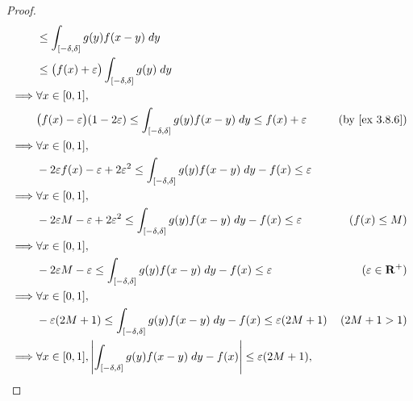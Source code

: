 \begin{proof}
\begin{align*}
             & \leq \int_{[-\delta, \delta]} g(y) f(x - y) \; dy                                                                                                           \\
             & \leq \big(f(x) + \varepsilon\big) \int_{[-\delta, \delta]} g(y) \; dy                                                                                       \\
    \implies & \forall x \in [0, 1],                                                                                                                                       \\
             & \big(f(x) - \varepsilon\big) (1 - 2 \varepsilon) \leq \int_{[-\delta, \delta]} g(y) f(x - y) \; dy \leq f(x) + \varepsilon    & \text{(by \cref{ex 3.8.6})} \\
    \implies & \forall x \in [0, 1],                                                                                                                                       \\
             & -2 \varepsilon f(x) - \varepsilon + 2 \varepsilon^2 \leq \int_{[-\delta, \delta]} g(y) f(x - y) \; dy - f(x) \leq \varepsilon                               \\
    \implies & \forall x \in [0, 1],                                                                                                                                       \\
             & -2 \varepsilon M - \varepsilon + 2 \varepsilon^2 \leq \int_{[-\delta, \delta]} g(y) f(x - y) \; dy - f(x) \leq \varepsilon    & (f(x) \leq M)               \\
    \implies & \forall x \in [0, 1],                                                                                                                                       \\
             & -2 \varepsilon M - \varepsilon \leq \int_{[-\delta, \delta]} g(y) f(x - y) \; dy - f(x) \leq \varepsilon                      & (\varepsilon \in \R^+)      \\
    \implies & \forall x \in [0, 1],                                                                                                                                       \\
             & -\varepsilon (2M + 1) \leq \int_{[-\delta, \delta]} g(y) f(x - y) \; dy - f(x) \leq \varepsilon (2M + 1)                      & (2M + 1 > 1)                \\
    \implies & \forall x \in [0, 1], \abs{\int_{[-\delta, \delta]} g(y) f(x - y) \; dy - f(x)} \leq \varepsilon (2M + 1),

\end{align*}
\end{proof}
